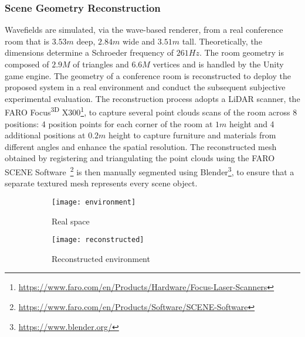 \subsubsection{Scene Geometry Reconstruction}
Wavefields are simulated, via the wave-based renderer, from a real conference room that is $3.53m$ deep, $2.84m$ wide and $3.51m$ tall. Theoretically, the dimensions determine a Schroeder frequency of $261Hz$. The room geometry is composed of $2.9M$ of triangles and $6.6M$ vertices and is handled by the Unity game engine.
The geometry of a conference room is reconstructed to deploy the proposed system in a real environment and conduct the subsequent subjective experimental evaluation. The reconstruction process adopts a LiDAR scanner, the FARO Focus\textsuperscript{3D} X300\footnote{\url{https://www.faro.com/en/Products/Hardware/Focus-Laser-Scanners}}, to capture several point clouds scans of the room across 8 positions: 4 position points for each corner of the room at $1m$ height and 4 additional positions at $0.2m$ height to capture furniture and materials from different angles and enhance the spatial resolution. The reconstructed mesh obtained by registering and triangulating the point clouds using the FARO SCENE Software~\footnote{\url{https://www.faro.com/en/Products/Software/SCENE-Software}} is then manually segmented using Blender\footnote{\url{https://www.blender.org/}}, to ensure that a separate textured mesh represents every scene object.
\begin{figure}
    \centering
    \begin{subfigure}[t]{0.49\textwidth}
       \centering
       \texttt{[image: environment]}
       \caption{Real space}
       \label{fig:chi-input-env}
    \end{subfigure}
    \begin{subfigure}[t]{0.49\textwidth}
       \centering
       \texttt{[image: reconstructed]}
       \caption{Reconstructed environment}
       \label{fig:chi-reconstructed-env}
    \end{subfigure}
\caption[Texture-based system evaluation --- environment reconstruction process]{}
\label{fig:chi-scanning}
\end{figure}

